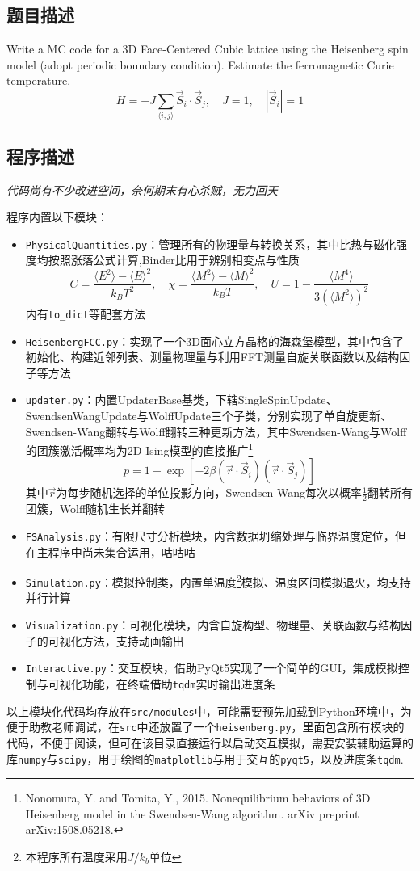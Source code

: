 \subsection{题目描述}
\noindent
Write a MC code for a 3D Face-Centered Cubic lattice using the Heisenberg spin
model (adopt periodic boundary condition). Estimate the ferromagnetic Curie temperature.
\[
    H = -J \sum_{\langle i,j \rangle} \vec{S}_i \cdot \vec{S}_j, \quad J = 1, \quad |\vec{S}_i| = 1
\]


\subsection{程序描述}
\textit{代码尚有不少改进空间，奈何期末有心杀贼，无力回天}

程序内置以下模块：
\begin{itemize}
    \item \texttt{PhysicalQuantities.py}：管理所有的物理量与转换关系，其中比热与磁化强度均按照涨落公式计算,Binder比用于辨别相变点与性质
          \[
              C = \frac{\langle E^2 \rangle - \langle E \rangle^2}{k_B T^2}, \quad \chi = \frac{\langle M^2 \rangle - \langle M \rangle^2}{k_B T}, \quad U  = 1- \frac{\langle M^4 \rangle }{3(\langle M^2 \rangle)^2 }
          \]
          内有\texttt{to\_dict}等配套方法
    \item \texttt{HeisenbergFCC.py}：实现了一个3D面心立方晶格的海森堡模型，其中包含了初始化、构建近邻列表、测量物理量与利用FFT测量自旋关联函数以及结构因子等方法
    \item \texttt{updater.py}：内置UpdaterBase基类，下辖SingleSpinUpdate、SwendsenWangUpdate与WolffUpdate三个子类，分别实现了单自旋更新、Swendsen-Wang翻转与Wolff翻转三种更新方法，其中Swendsen-Wang与Wolff的团簇激活概率均为2D Ising模型的直接推广\footnote{Nonomura, Y. and Tomita, Y., 2015. Nonequilibrium behaviors of 3D Heisenberg model in the Swendsen-Wang algorithm. arXiv preprint \href{https://arxiv.org/abs/1508.05218}{arXiv:1508.05218.}}
          \[
              p=1-\exp[-2\beta (\overrightarrow{r}\cdot\overrightarrow{S}_i)(\overrightarrow{r}\cdot\overrightarrow{S}_j)]
          \]
          其中$\overrightarrow{r}$为每步随机选择的单位投影方向，Swendsen-Wang每次以概率$\frac{1}{2}$翻转所有团簇，Wolff随机生长并翻转
    \item \texttt{FSAnalysis.py}：有限尺寸分析模块，内含数据坍缩处理与临界温度定位，但在主程序中尚未集合运用，咕咕咕
    \item \texttt{Simulation.py}：模拟控制类，内置单温度\footnote{本程序所有温度采用$J/k_b$单位}模拟、温度区间模拟退火，均支持并行计算
    \item \texttt{Visualization.py}：可视化模块，内含自旋构型、物理量、关联函数与结构因子的可视化方法，支持动画输出
    \item \texttt{Interactive.py}：交互模块，借助PyQt5实现了一个简单的GUI，集成模拟控制与可视化功能，在终端借助\texttt{tqdm}实时输出进度条
\end{itemize}
以上模块化代码均存放在\texttt{src/modules}中，可能需要预先加载到Python环境中，为便于助教老师调试，在\texttt{src}中还放置了一个\texttt{heisenberg.py}，里面包含所有模块的代码，不便于阅读，但可在该目录直接运行以启动交互模拟，需要安装辅助运算的库\texttt{numpy}与\texttt{scipy}，用于绘图的\texttt{matplotlib}与用于交互的\texttt{pyqt5}，以及进度条\texttt{tqdm}.
